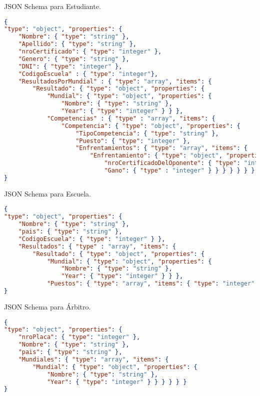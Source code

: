 JSON Schema para Estudiante.
\begin{lstlisting}[language=json]
{
"type": "object", "properties": {
    "Nombre": { "type": "string" },
    "Apellido": { "type": "string" },
    "nroCertificado": { "type": "integer" },
    "Genero": { "type": "string" },
    "DNI": { "type": "integer" },
    "CodigoEscuela" : { "type": "integer"},
    "ResultadosPorMundial" : { "type": "array", "items": {
        "Resultado": { "type": "object", "properties": {
            "Mundial": { "type": "object", "properties": {
                "Nombre": { "type": "string" },
                "Year": { "type": "integer" } } },
            "Competencias" : { "type" : "array", "items": {
                "Competencia": { "type": "object", "properties": {
                    "TipoCompetencia": { "type": "string" },
                    "Puesto": { "type": "integer" },
                    "Enfrentamientos": { "type": "array", "items": {
                        "Enfrentamiento": { "type": "object", "properties": {
                            "nroCertificadoDelOponente": { "type": "integer" },
                            "Gano": { "type" : "integer" } } } } } } } } } } } } } }
}
\end{lstlisting}

JSON Schema para Escuela.
\begin{lstlisting}[language=json]
{
"type": "object", "properties": {
    "Nombre": { "type": "string" },
    "pais": { "type": "string" },
    "CodigoEscuela": { "type": "integer" } },
    "Resultados": { "type" : "array", "items": {
        "Resultado": { "type": "object", "properties": {
            "Mundial": { "type": "object", "properties": {
                "Nombre": { "type": "string" },
                "Year": { "type": "integer" } } },
            "Puestos": { "type": "array", "items": { "type": "integer" } } } } } }
}
\end{lstlisting}

JSON Schema para Árbitro.
\begin{lstlisting}[language=json]
{
"type": "object", "properties": {
    "nroPlaca": { "type": "integer" },
    "Nombre": { "type": "string" },
    "pais": { "type": "string" },
    "Mundiales": { "type": "array", "items": {
        "Mundial": { "type": "object", "properties": {
            "Nombre": { "type": "string" },
            "Year": { "type": "integer" } } } } } }
}
\end{lstlisting}


